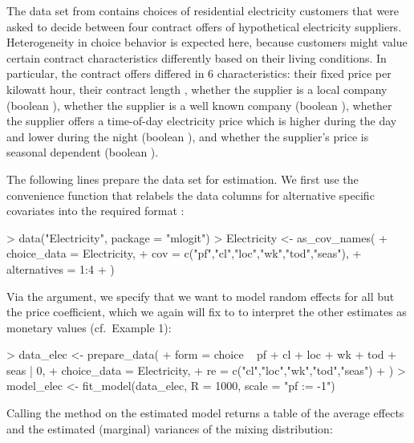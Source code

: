 \documentclass[article,shortnames]{jss}
\newcommand{\fct}[1]{\code{#1()}}
\begin{document}
The  data set from  contains choices of residential electricity customers that were asked to decide between four contract offers of hypothetical electricity suppliers. Heterogeneity in choice behavior is expected here, because customers might value certain contract characteristics differently based on their living conditions. In particular, the contract offers differed in 6 characteristics: their fixed price  per kilowatt hour, their contract length , whether the supplier is a local company (boolean ), whether the supplier is a well known company (boolean ), whether the supplier offers a time-of-day electricity price which is higher during the day and lower during the night (boolean ), and whether the supplier's price is seasonal dependent (boolean ).

The following lines prepare the data set for estimation. We first use the convenience function \fct{as\_cov\_names} that relabels the data columns for alternative specific covariates into the required format :

\begin{Schunk}
\begin{Sinput}
> data("Electricity", package = "mlogit")
> Electricity <- as_cov_names(
+    choice_data = Electricity,
+    cov = c("pf","cl","loc","wk","tod","seas"),
+    alternatives = 1:4
+  )
\end{Sinput}
\end{Schunk}

Via the  argument, we specify that we want to model random effects for all but the price coefficient, which we again will fix to  to interpret the other estimates as monetary values (cf.\ Example 1):

\begin{Schunk}
\begin{Sinput}
> data_elec <- prepare_data(
+    form = choice ~ pf + cl + loc + wk + tod + seas | 0,
+    choice_data = Electricity,
+    re = c("cl","loc","wk","tod","seas")
+  )
> model_elec <- fit_model(data_elec, R = 1000, scale = "pf := -1")
\end{Sinput}
\end{Schunk}

Calling the \fct{coef} method on the estimated model returns a table of the average effects and the estimated (marginal) variances of the mixing distribution:
\end{document}

